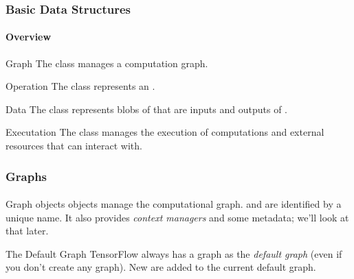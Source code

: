 
\begin{frame}
    \frametitle{Basic Data Structures}
    \framesubtitle{Overview}
    \begin{block}{Graph}
        The  class manages a computation graph.
    \end{block}
    \begin{block}{Operation}
        The  class represents an .
    \end{block}
    \begin{block}{Data}
        The  class represents blobs of  that are inputs and outputs
        of .
    \end{block}
    \begin{block}{Executation}
        The  class manages the execution of computations and external resources
        that  can interact with.
    \end{block}
\end{frame}

\begin{frame}
    \frametitle{Graphs}
    \framesubtitle{}
    \begin{block}{Graph objects}
     objects manage the computational graph. 
     and  are identified by a unique name. 
    It also provides \emph{context managers} and some metadata; we'll look at that later.
    \end{block}
    \pause
    \begin{block}{The Default Graph}
        TensorFlow always has a graph as the \emph{default graph} (even if you don't create any graph).
        New  are added to the current default graph.  
    \end{block}
\end{frame}

